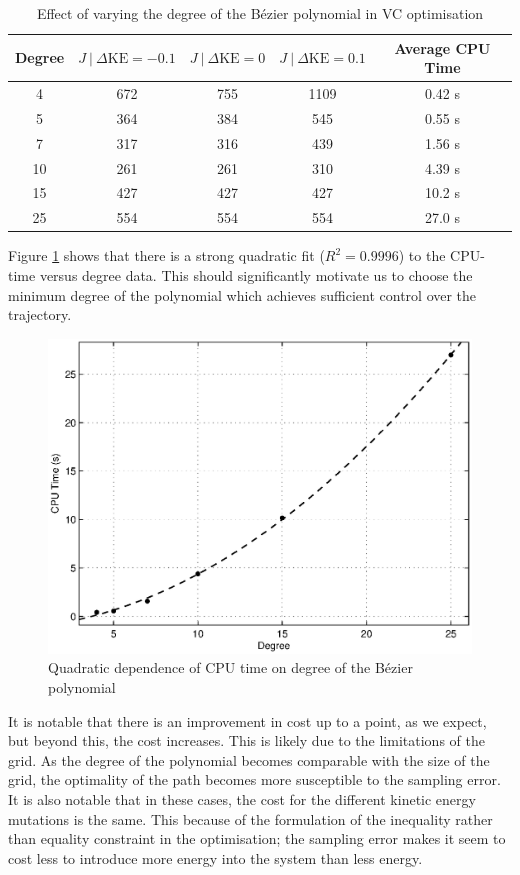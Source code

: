 \begin{table}
	\centering
	\begin{tabular}{c || c | c |c || c}
		Degree & $J~|~{\Delta\mathrm{KE}=-0.1}$ & $J~|~{\Delta\mathrm{KE}=0}$ & $J~|~{\Delta\mathrm{KE}=0.1}$ & Average CPU Time \\ \hline
		4  & 672 & 755 & 1109 & 0.42 s \\
		5  & 364 & 384 & 545  & 0.55 s \\
		7  & 317 & 316 & 439  & 1.56 s \\
		10 & 261 & 261 & 310  & 4.39 s \\
		15 & 427 & 427 & 427  & 10.2 s \\
		25 & 554 & 554 & 554  & 27.0 s
	\end{tabular}
	\caption{Effect of varying the degree of the Bézier polynomial in VC optimisation}
	\label{tab:degpol}
\end{table}

Figure \ref{fig:timevsdeg} shows that there is a strong quadratic fit ($R^2=0.9996$) to the CPU-time versus degree data. This should significantly motivate us to choose the minimum degree of the polynomial which achieves sufficient control over the trajectory.

\begin{figure}
\centering
\includegraphics[width=0.6\linewidth]{7Results/timevsdeg}
\caption{Quadratic dependence of CPU time on degree of the Bézier polynomial}
\label{fig:timevsdeg}
\end{figure}


It is notable that there is an improvement in cost up to a point, as we expect, but beyond this, the cost increases. This is likely due to the limitations of the grid. As the degree of the polynomial becomes comparable with the size of the grid, the optimality of the path becomes more susceptible to the sampling error. It is also notable that in these cases, the cost for the different kinetic energy mutations is the same. This because of the formulation of the inequality rather than equality constraint in the optimisation; the sampling error makes it seem to cost less to introduce more energy into the system than less energy.

